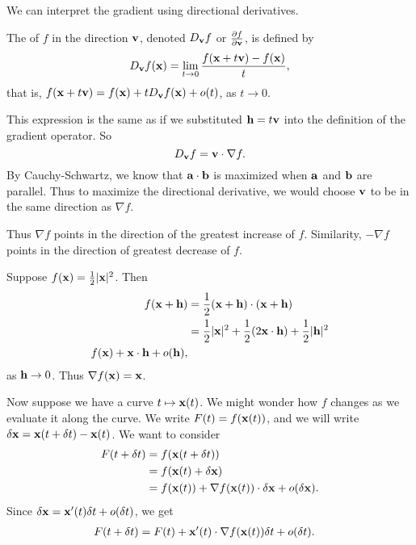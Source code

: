 \documentclass[a4paper]{scrreprt}
\begin{document}
We can interpret the gradient using directional derivatives.
\begin{definition}
	The  of $f$ in the direction $\mathbf{v}$, denoted $D_{\mathbf{v}} f$ or $\frac{\partial f}{\partial \mathbf{v}}$, is defined by
	$$
	D_{\mathbf{v}} f(\mathbf{x}) = \lim_{t\to 0} \frac{f(\mathbf{x} + t \mathbf{v}) - f(\mathbf{x})}{t},
	$$
	that is, $f(\mathbf{x} + t \mathbf{v}) = f(\mathbf{x}) + t D_{\mathbf{v}} f(\mathbf{x}) + o(t)$, as $t \rightarrow 0$.
\end{definition}

This expression is the same as if we substituted  $\mathbf{h} = t \mathbf{v}$ into the definition of the gradient operator.
So
$$
D_{\mathbf{v}} f = \mathbf{v} \cdot \nabla f.
$$
By Cauchy-Schwartz, we know that $\mathbf{a} \cdot \mathbf{b}$ is maximized when $\mathbf{a}$ and $\mathbf{b}$ are parallel. Thus to maximize the directional derivative, we would choose $\mathbf{v}$ to be in the same direction as $\nabla f$.

Thus $\nabla f$ points in the direction of the greatest increase of $f$.  Similarity, $- \nabla f$ points in the direction of greatest decrease of $f$.

\begin{example}
	Suppose $f(\mathbf{x}) = \frac{1}{2}| \mathbf{x}|^2$. Then
	\begin{align*}
		f(\mathbf{x} + \mathbf{h}) &= \frac{1}{2}(\mathbf{x} + \mathbf{h}) \cdot (\mathbf{x} + \mathbf{h})\\
		&= \frac{1}{2} |\mathbf{x}|^2 + \frac{1}{2}(2 \mathbf{x} \cdot \mathbf{h}) + \frac{1}{2}|\mathbf{h}|^2 \\
		f(\mathbf{x}) + \mathbf{x}\cdot \mathbf{h} + o(\mathbf{h}),
	\end{align*}
	as $\mathbf{h} \rightarrow 0$. Thus $\nabla f(\mathbf{x}) = \mathbf{x}$.
\end{example}

Now suppose we have a curve $t \mapsto \mathbf{x}(t)$. We might wonder how $f$ changes as we evaluate it along the curve. We write $F(t) = f(\mathbf{x}(t))$, and we will write $\delta \mathbf{x} = \mathbf{x}(t + \delta t) - \mathbf{x}(t)$. We want to consider 
\begin{align*}
	F(t + \delta t) &= f(\mathbf{x}(t + \delta t))\\
	 &= f(\mathbf{x}(t) + \delta 
	 \mathbf{x}) \\
	 &= f(\mathbf{x}(t)) + \nabla f(\mathbf{x}(t)) \cdot \delta \mathbf{x} + o(\delta \mathbf{x}). 
\end{align*}
Since $\delta \mathbf{x} = \mathbf{x}'(t) \delta t + o(\delta t)$, we get
\begin{align*}
	F(t + \delta t) &= F(t) + \mathbf{x}'(t) \cdot \nabla f(\mathbf{x}(t)) \delta t + o(\delta t).
\end{align*}
\end{document}
